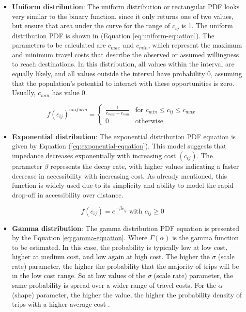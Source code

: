 \documentclass[preprint, 3p,
authoryear]{elsarticle} %
\providecommand{\tightlist}{%
  \setlength{\itemsep}{0pt}\setlength{\parskip}{0pt}}
\begin{document}
\begin{itemize}
\tightlist
\item
  \textbf{Uniform distribution}: The uniform distribution or rectangular
  PDF looks very similar to the binary function, since it only returns
  one of two values, but ensure that area under the curve for the range
  of \(c_{ij}\) is 1. The uniform distribution PDF is shown in (Equation
  \ref{eq:uniform-equation}). The parameters to be calculated are
  \(c_{max}\) and \(c_{min}\), which represent the maximum and minimum
  travel costs that describe the observed or assumed willingness to
  reach destinations. In this distribution, all values within the
  interval are equally likely, and all values outside the interval have
  probability 0, assuming that the population's potential to interact
  with these opportunities is zero. Usually, \(c_{min}\) has value 0.
\end{itemize}

\begin{equation}
f(c_{ij})^{uniform} =
\begin{cases}
  \frac{1}{c_{max} - c_{min}} & \text{for } c_{min} \le c_{ij} \le c_{max} \\
  0 & \text{otherwise}
\end{cases}
\label{eq:uniform-equation}
\end{equation}

\begin{itemize}
\tightlist
\item
  \textbf{Exponential distribution}: The exponential distribution PDF
  equation is given by Equation (\ref{eq:exponential-equation}). This
  model suggests that impedance decreases exponentially with increasing
  cost \((c_{ij})\). The parameter \(\beta\) represents the decay rate,
  with higher values indicating a faster decrease in accessibility with
  increasing cost. As already mentioned, this function is widely used
  due to its simplicity and ability to model the rapid drop-off in
  accessibility over distance.
\end{itemize}

\begin{equation}
f(c_{ij}) = e^{-\beta c_{ij}} \text{ with } c_{ij} \ge 0
\label{eq:exponential-equation}
\end{equation}

\begin{itemize}
\tightlist
\item
  \textbf{Gamma distribution}: The gamma distribution PDF equation is
  presented by the Equation \ref{eq:gamma-equation}. Where
  \(\Gamma(\alpha)\) is the gamma function to be estimated. In this
  case, the probability is typically low at low cost, higher at medium
  cost, and low again at high cost. The higher the \(\sigma\) (scale
  rate) parameter, the higher the probability that the majority of trips
  will be in the low cost range. So at low values of the \(\sigma\)
  (scale rate) parameter, the same probability is spread over a wider
  range of travel costs. For the \(\alpha\) (shape) parameter, the
  higher the value, the higher the probability density of trips with a
  higher average cost \citep{soukhov2024}.
\end{itemize}
\end{document}
